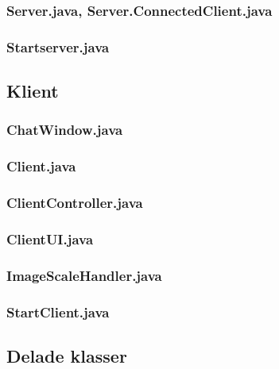 \documentclass[a4paper,11pt]{article}
\begin{document}
		\subsubsection{Server.java, Server.ConnectedClient.java}
		
		\subsubsection{Startserver.java}
		
		
	\subsection{Klient}
		\subsubsection{ChatWindow.java}
		
		\subsubsection{Client.java}
		
		\subsubsection{ClientController.java}
		
		\subsubsection{ClientUI.java}
		
		\subsubsection{ImageScaleHandler.java}
		
		\subsubsection{StartClient.java}
		

	\subsection{Delade klasser}
\end{document}
